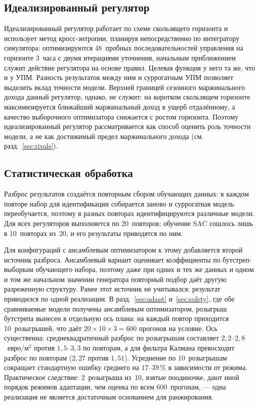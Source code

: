 \documentclass[12pt,a4paper,leqno]{article}
\begin{document}
\subsection{Идеализированный регулятор}
Идеализированный регулятор работает по схеме скользящего горизонта и использует метод
кросс-энтропии, планируя непосредственно по интегратору симулятора:
оптимизируются 48~пробных последовательностей управления на горизонте 3~часа с двумя
итерациями уточнения, начальным приближением служит действие регулятора на основе
правил. Целевая функция у него та же, что и у УПМ. Разность результатов между ним и
суррогатным УПМ позволяет выделить вклад точности модели. Верхней границей сезонного
маржинального дохода данный регулятор, однако, не служит: на коротком скользящем горизонте
максимизируется ближайший маржинальный доход в ущерб отдалённому, а качество выборочного
оптимизатора снижается с ростом горизонта. Поэтому идеализированный регулятор
рассматривается как способ оценить роль точности модели, а не как достижимый предел
маржинального дохода (см. разд.~\ref{sec:rivals}).

\subsection{Статистическая обработка}
Разброс результатов создаётся повторным сбором обучающих данных: в каждом повторе набор
для идентификации собирается заново и суррогатная модель переобучается, поэтому в
разных повторах идентифицируются различные модели. Для всех регуляторов выполняется по
20~повторов; обучение SAC сошлось лишь в 10~повторах из~20, и его результаты приводятся
по ним.

Для конфигураций с ансамблевым оптимизатором к этому добавляется второй источник
разброса. Ансамблевый вариант оценивает коэффициенты по бутстреп-выборкам обучающего
набора, поэтому даже при одних и тех же данных и одном и том же начальном значении
генератора повторный подбор даёт другую разреженную структуру. Ранее этот источник не
учитывался: результат приводился по одной реализации. В разд.~\ref{sec:adapt}
и~\ref{sec:safety}, где обе сравниваемые модели получены ансамблевым оптимизатором,
розыгрыш бутстрепа вынесен в отдельную ось плана: на каждый повтор приходится
10~розыгрышей, что даёт $20\times10\times3=600$ прогонов на условие. Ось существенна:
среднеквадратичный разброс по розыгрышам составляет $2{,}2$--$2{,}8$~евро/м$^2$ против
$1{,}5$--$3{,}3$ по повторам, а для фильтра Калмана превосходит разброс по повторам
($2{,}27$ против $1{,}51$). Усреднение по 10~розыгрышам сокращает стандартную ошибку
среднего на $17$--$39\,\%$ в зависимости от режима. Практическое следствие: 2~розыгрыша
из~10, взятые поодиночке, дают иной порядок режимов адаптации, чем оценка по всем
600~прогонам, — одна реализация не является достаточным основанием для ранжирования.
\end{document}
